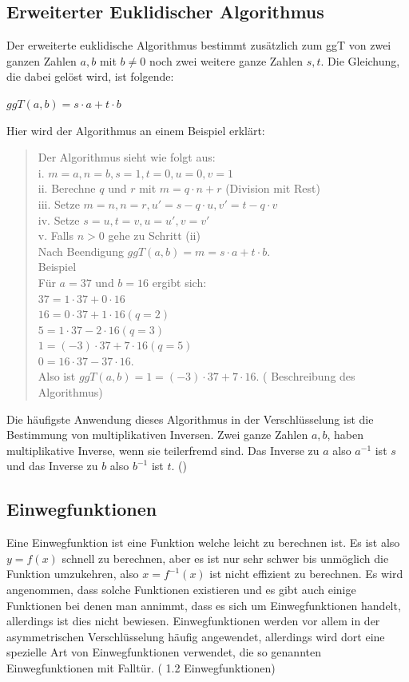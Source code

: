 \documentclass[a4paper,12pt,titlepage]{article}
\begin{document}
\subsection{Erweiterter Euklidischer Algorithmus}\label{exteuk}
Der erweiterte euklidische Algorithmus bestimmt zusätzlich zum ggT von zwei ganzen Zahlen $a,b$ mit $b \neq 0$ noch zwei weitere ganze Zahlen $s,t$. Die Gleichung, die dabei gelöst wird, ist folgende:
\begin{center}
$ggT(a,b) = s \cdot a + t \cdot b$
\end{center}
Hier wird der Algorithmus an einem Beispiel erklärt:
\begin{quote}
\glqq Der Algorithmus sieht wie folgt aus:  \\
i. $m = a, n = b, s = 1, t = 0, u = 0, v = 1$ \\
ii. Berechne $q$ und $r$ mit $m = q\cdot n + r$ (Division mit Rest) \\
iii. Setze $m = n, n = r, u'=s - q \cdot u, v'= t-q \cdot v$\\
iv. Setze $s=u, t=v,u=u',v=v'$ \\
v. Falls $n>0$ gehe zu Schritt (ii) \\
Nach Beendigung $ggT(a,b) = m = s \cdot a + t \cdot b$. \\[1\baselineskip]

Beispiel\\
Für $a = 37$ und $b = 16$ ergibt sich: \\
$37 = 1 \cdot 37 + 0 \cdot 16$\\
$16 = 0 \cdot 37 + 1 \cdot 16 (q=2)$\\
$5 = 1 \cdot 37 - 2 \cdot 16 (q=3)$\\
$1 = (-3) \cdot 37 + 7 \cdot 16 (q=5)$\\
$0 = 16 \cdot 37 - 37 \cdot 16$.\\
Also ist $ggT(a,b) = 1 = (-3) \cdot 37 + 7 \cdot 16$.\grqq{} (\cite{exteuk} Beschreibung des Algorithmus)
\end{quote}
Die häufigste Anwendung dieses Algorithmus in der Verschlüsselung ist die Bestimmung von multiplikativen Inversen. Zwei ganze Zahlen $a, b$, haben multiplikative Inverse, wenn sie teilerfremd sind. 
Das Inverse zu $a$ also $a^{-1}$ ist $s$ und das Inverse zu $b$ also $b^{-1}$ ist $t$. (\cite{exteuk})
\subsection{Einwegfunktionen}
Eine Einwegfunktion ist eine Funktion welche leicht zu berechnen ist. Es ist also $y = f(x)$ schnell zu  berechnen, aber es ist nur sehr schwer bis unmöglich die Funktion umzukehren, also $x = f^{-1}(x)$ ist nicht effizient zu berechnen. Es wird angenommen, dass solche Funktionen existieren und es gibt auch einige Funktionen bei denen man annimmt, dass es sich um Einwegfunktionen handelt, allerdings ist dies nicht bewiesen. Einwegfunktionen werden vor allem in der asymmetrischen Verschlüsselung häufig angewendet, allerdings wird dort eine spezielle Art von Einwegfunktionen verwendet, die so genannten Einwegfunktionen mit Falltür. (\cite{oneway_lukas} 1.2 Einwegfunktionen)
\end{document}
